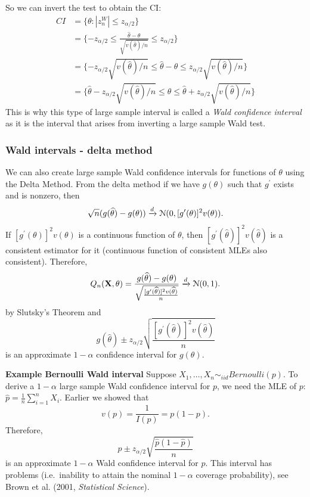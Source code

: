 \documentclass[11pt,]{article}
\newcommand{\Xndots}{X_1, \ldots, X_n}
\def\bX{{\bf X}}
\def\phat{{\widehat p}}
\def\thetahat{{\widehat\theta}}
\def\Nsc{{\cal N}}
\def\sumin{\sum_{i=1}^n}
\begin{document}
So we can invert the test to obtain the CI: \begin{align*}
CI &= \{\theta: |z_n^W| \leq z_{\alpha/2}\}\\
&= \{  - z_{\alpha/2} \leq \frac{\thetahat - \theta}{\sqrt{v(\thetahat)/n}} \leq z_{\alpha/2} \}\\
&= \{  - z_{\alpha/2} \sqrt{v(\thetahat)/n}\leq {\thetahat - \theta} \leq z_{\alpha/2} \sqrt{v(\thetahat)/n}\}\\
&= \{ \thetahat - z_{\alpha/2} \sqrt{v(\thetahat)/n}\leq {  \theta} \leq \thetahat + z_{\alpha/2} \sqrt{v(\thetahat)/n}\}
\end{align*} This is why this type of large sample interval is called a
\emph{Wald confidence interval} as it is the interval that arises from
inverting a large sample Wald test.

\subsubsection{Wald intervals - delta method}

We can also create large sample Wald confidence intervals for functions
of \(\theta\) using the Delta Method. From the delta method if we have
\(g(\theta)\) such that \(g^\prime\) exists and is nonzero, then
\[\sqrt{n}(g(\thetahat) - g(\theta)) \xrightarrow{d} \Nsc(0,[g^\prime(\theta)]^2 v(\theta)).\]
If \([g^\prime(\theta)]^2 v(\theta)\) is a continuous function of
\(\theta\), then \([g^\prime(\thetahat)]^2 v(\thetahat)\) is a
consistent estimator for it (continuous function of consistent MLEs also
consistent). Therefore,
\[Q_n(\bX,\theta) = \frac{g(\thetahat) - g(\theta)}{\sqrt{\frac{[g^\prime(\thetahat)]^2v(\thetahat)}{n}}} \xrightarrow{d} \Nsc(0,1).\]
by Slutsky's Theorem and
\[g(\thetahat) \pm z_{\alpha/2}\sqrt{\frac{[g^\prime(\thetahat)]^2v(\thetahat)}{n}}\]
is an approximate \(1-\alpha\) confidence interval for \(g(\theta)\).

\noindent\textbf{Example Bernoulli Wald interval} Suppose
\(\Xndots \sim_{iid} Bernoulli(p)\). To derive a \(1-\alpha\) large
sample Wald confidence interval for \(p\), we need the MLE of \(p\):
\(\phat = \frac{1}{n} \sumin X_i\). Earlier we showed that
\[v(p) = \frac{1}{I(p)} = p(1-p).\] Therefore,
\[\phat \pm z_{\alpha/2}\sqrt{\frac{\phat(1-\phat)}{n}}\] is an
approximate \(1-\alpha\) Wald confidence interval for \(p\). This
interval has problems (i.e.~inability to attain the nominal \(1-\alpha\)
coverage probability), see Brown et al. (2001, \emph{Statistical
Science}).
\end{document}
